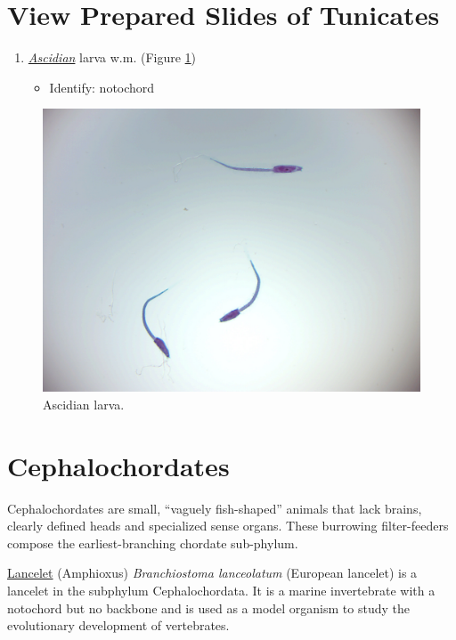 \section{View Prepared Slides of
Tunicates}\label{view-prepared-slides-of-tunicates}

\begin{enumerate}
\def\labelenumi{\arabic{enumi}.}
\tightlist
\item
  \href{https://en.wikipedia.org/wiki/Ascidiacea}{\emph{Ascidian}} larva
  w.m. (Figure \ref{fig:ascidian})

  \begin{itemize}
  \tightlist
  \item
    Identify: notochord
  \end{itemize}
\end{enumerate}

\begin{figure}

{\centering \includegraphics[width=0.7\linewidth]{./figures/echinodermata/ascidian_larva}

}

\caption{Ascidian larva.}\label{fig:ascidian}
\end{figure}

\section{Cephalochordates}\label{cephalochordates}

Cephalochordates are small, ``vaguely fish-shaped'' animals that lack
brains, clearly defined heads and specialized sense organs. These
burrowing filter-feeders compose the earliest-branching chordate
sub-phylum.

\href{https://en.wikipedia.org/wiki/Lancelet}{Lancelet} (Amphioxus)
\emph{Branchiostoma lanceolatum} (European lancelet) is a lancelet in
the subphylum Cephalochordata. It is a marine invertebrate with a
notochord but no backbone and is used as a model organism to study the
evolutionary development of vertebrates.

